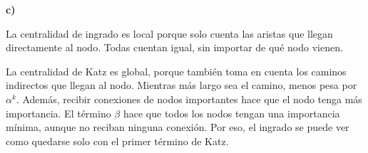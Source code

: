 \documentclass[11pt]{article}
\begin{document}
\textbf{c)}

La centralidad de ingrado es local porque solo cuenta las aristas que llegan directamente al nodo. Todas cuentan igual, sin importar de qué nodo vienen.

La centralidad de Katz es global, porque también toma en cuenta los caminos indirectos que llegan al nodo. Mientras más largo sea el camino, menos pesa por $\alpha^k$. Además, recibir conexiones de nodos importantes hace que el nodo tenga más importancia. El término $\beta$ hace que todos los nodos tengan una importancia mínima, aunque no reciban ninguna conexión. Por eso, el ingrado se puede ver como quedarse solo con el primer término de Katz.
\end{document}
